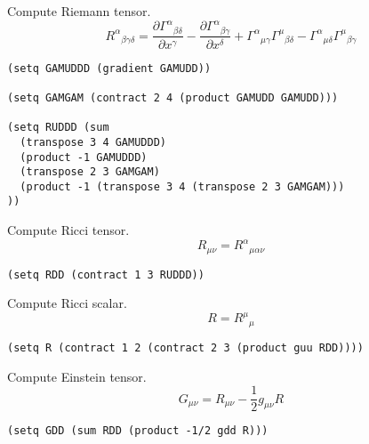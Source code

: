 \documentclass[12pt]{article}
\begin{document}
Compute Riemann tensor.
%
\begin{equation*}
R^\alpha{}_{\beta\gamma\delta}
=\frac{\partial\Gamma^\alpha{}_{\beta\delta}}{\partial x^\gamma}
-\frac{\partial\Gamma^\alpha{}_{\beta\gamma}}{\partial x^\delta}
+\Gamma^\alpha{}_{\mu\gamma}\Gamma^\mu{}_{\beta\delta}
-\Gamma^\alpha{}_{\mu\delta}\Gamma^\mu{}_{\beta\gamma}
\end{equation*}
%
\begin{verbatim}
(setq GAMUDDD (gradient GAMUDD))

(setq GAMGAM (contract 2 4 (product GAMUDD GAMUDD)))

(setq RUDDD (sum
  (transpose 3 4 GAMUDDD)
  (product -1 GAMUDDD)
  (transpose 2 3 GAMGAM)
  (product -1 (transpose 3 4 (transpose 2 3 GAMGAM)))
))
\end{verbatim}

Compute Ricci tensor.
\begin{equation*}
R_{\mu\nu}=R^\alpha{}_{\mu\alpha\nu}
\end{equation*}
%
\begin{verbatim}
(setq RDD (contract 1 3 RUDDD))
\end{verbatim}

Compute Ricci scalar.
\begin{equation*}
R=R^\mu{}_\mu
\end{equation*}
%
\begin{verbatim}
(setq R (contract 1 2 (contract 2 3 (product guu RDD))))
\end{verbatim}

Compute Einstein tensor.
\begin{equation*}
G_{\mu\nu}=R_{\mu\nu}-\frac{1}{2}g_{\mu\nu}R
\end{equation*}
%
\begin{verbatim}
(setq GDD (sum RDD (product -1/2 gdd R)))
\end{verbatim}
\end{document}
